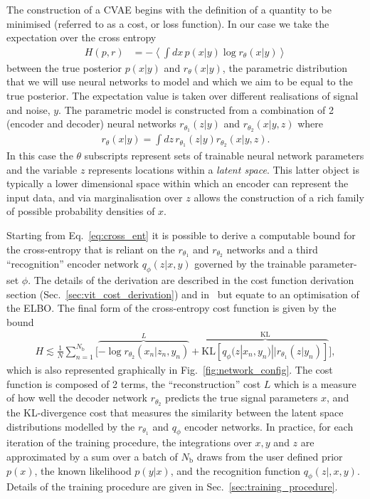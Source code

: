 %
%
The construction of a \ac{CVAE} begins with the definition 
of a quantity to be minimised (referred to as a cost, or loss function). In 
our case we take the expectation over the cross entropy
%
\begin{align}\label{eq:cross_ent} 
H(p,r) &= - \left \langle \int dx\, p(x|y) \log r_{\theta}(x|y) \right \rangle 
\end{align}
%
between the true posterior $p(x|y)$ and 
$r_{\theta}(x|y)$, the parametric distribution that 
we will use neural networks to model and which we aim to be equal to 
the true posterior. The expectation value is taken over different realisations of signal 
and noise, $y$. The parametric model is
constructed from a combination of 2 (encoder and decoder) neural networks $r_{\theta_1}(z|y)$ and $r_{\theta_2}(x|y,z)$ where
%
\begin{align}\label{eq:latent_model}
r_{\theta}(x|y) = \int dz\,r_{\theta_1}(z|y)r_{\theta_2}(x|y,z).
\end{align}
%
In this case the $\theta$ subscripts represent sets of trainable neural network parameters and 
the variable $z$ represents locations within a \emph{latent space}. This latter object is 
typically a lower dimensional space within which an encoder can represent the input 
data, and via marginalisation 
over $z$ allows the construction of a rich family of possible probability densities of $x$.

Starting from Eq.~\ref{eq:cross_ent} it is possible to derive a computable bound for 
the cross-entropy that is reliant on the $r_{\theta_1}$ and $r_{\theta_2}$ 
networks and a third ``recognition'' encoder
network $q_{\phi}(z|x,y)$ governed by the trainable parameter-set $\phi$. 
The details of the derivation are described in the cost function derivation section 
(Sec.~\ref{sec:vit_cost_derivation}) and in~\cite{1904.06264} but equate to an 
optimisation of the \ac{ELBO}. The final form of the cross-entropy 
cost function is given by the bound
%
\begin{align}\label{eq:cost3} H \lesssim
\frac{1}{N}\sum_{n=1}^{N_{\text{b}}}\Big[\overbrace{-\log
r_{\theta_{2}}(x_{n}|z_{n},y_{n})}^{L}
+\overbrace{\text{KL}\left[q_{\phi}(z|x_{n},y_{n})||r_{\theta_{1}}(z|y_{n})\right]}^{\text{KL}}\Big],
\end{align}
%
which is also represented graphically in Fig.~\ref{fig:network_config}. The cost 
function is composed of 2 terms, the ``reconstruction'' cost $L$ which is a 
measure of how well the decoder network $r_{\theta_2}$ predicts the true signal 
parameters $x$, and the \ac{KL}-divergence cost that measures the similarity 
between the latent space distributions modelled by the $r_{\theta_1}$ and $q_{\phi}$ 
encoder networks. In practice, for each iteration of the training procedure, the 
integrations over $x,y$ and $z$ are approximated by a sum over a
batch of $N_{\text{b}}$ draws from the user defined prior $p(x)$, 
the known likelihood $p(y|x)$, and the recognition function 
$q_{\phi}(z|,x,y)$. Details of the training procedure are given in 
Sec.~\ref{sec:training_procedure}.  

